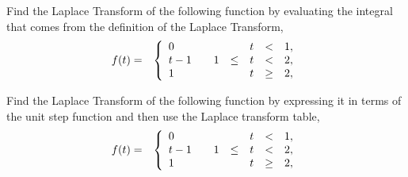 \begin{problem}
\clearpage

\item Find the Laplace Transform of the following function by
  evaluating the integral that comes from the definition of the
  Laplace Transform,
  \begin{eqnarray*}
      f(t) & = & \left\{
        \begin{array}{l@{\hspace{2em}}rcccl}
          0   &    &  & t & < & 1, \\
          t-1 &  1 & \leq & t & < & 2, \\
          1   &    &      & t & \geq & 2, \\
        \end{array}
      \right.
  \end{eqnarray*}
  \vfill

\item Find the Laplace Transform of the following function by
  expressing it in terms of the unit step function and then use the
  Laplace transform table,
  \begin{eqnarray*}
      f(t) & = & \left\{
        \begin{array}{l@{\hspace{2em}}rcccl}
          0   &    &  & t & < & 1, \\
          t-1 &  1 & \leq & t & < & 2, \\
          1   &    &      & t & \geq & 2, \\
        \end{array}
      \right.
  \end{eqnarray*}
  \vfill

\end{problem}

